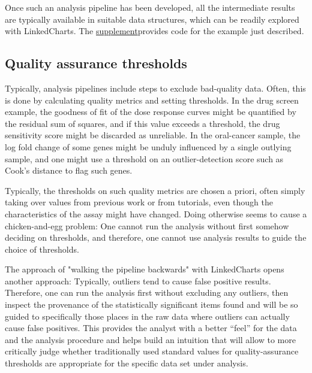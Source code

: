 \documentclass[twocolumn,10pt]{article}
\newcommand{\supplement}{\href{https://anders-biostat.github.io/lc-paper/}{supplement}}
\begin{document}
Once such an analysis pipeline has been developed, all the intermediate results are typically available in suitable data structures, which can be readily explored with LinkedCharts. The \supplement provides code for the example just described.

\subsection{Quality assurance thresholds}

Typically, analysis pipelines include steps to exclude bad-quality data. Often, this is done by calculating quality metrics and setting thresholds. In the drug screen example, the goodness of fit of the dose response curves might be quantified by the residual sum of squares, and if this value exceeds a threshold, the drug sensitivity score might be discarded as unreliable. In the oral-cancer sample, the log fold change of some genes might be unduly influenced by a single outlying sample, and one might use a threshold on an outlier-detection score such as Cook's distance to flag such genes.

Typically, the thresholds on such quality metrics are chosen a priori, often simply taking over values from previous work or from tutorials, even though the characteristics of the assay might have changed. Doing otherwise seems to cause a chicken-and-egg problem: One cannot run the analysis without first somehow deciding on thresholds, and therefore, one cannot use analysis results to guide the choice of thresholds.

The approach of "walking the pipeline backwards" with LinkedCharts opens another approach: Typically, outliers tend to cause false positive results. Therefore, one can run the analysis first without excluding any outliers, then inspect the provenance of the statistically significant items found and will be so guided to specifically those places in the raw data where outliers can actually cause false positives. This provides the analyst with a better ``feel'' for the data and the analysis procedure and helps build an intuition that will allow to more critically judge whether traditionally used standard values for quality-assurance thresholds are appropriate for the specific data set under analysis. 
\end{document}
